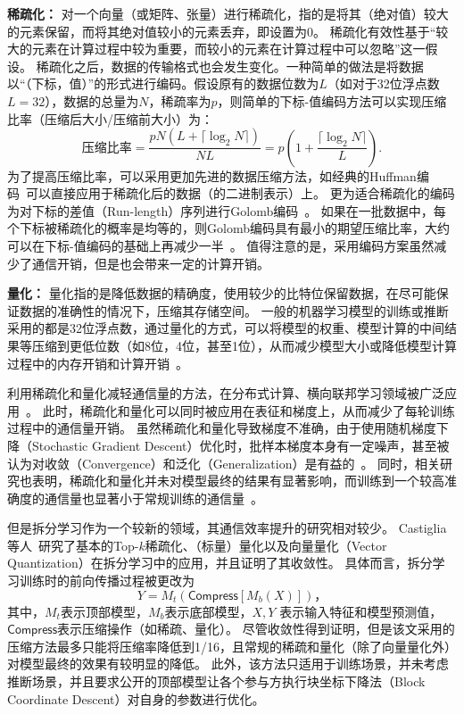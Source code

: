 \textbf{稀疏化：}
对一个向量（或矩阵、张量）进行稀疏化，指的是将其（绝对值）较大的元素保留，而将其绝对值较小的元素丢弃，即设置为0。
%
稀疏化有效性基于“较大的元素在计算过程中较为重要，而较小的元素在计算过程中可以忽略”这一假设。
%
稀疏化之后，数据的传输格式也会发生变化。一种简单的做法是将数据以“（下标，值）”的形式进行编码。假设原有的数据位数为$L$（如对于32位浮点数$L=32$），数据的总量为$N$，稀疏率为$p$，则简单的下标-值编码方法可以实现压缩比率（压缩后大小/压缩前大小）为：
\begin{equation}
    \text{压缩比率}=\dfrac{pN(L + \lceil \log_2N \rceil)}{NL} = p(1 + \dfrac{\lceil \log_2N \rceil}{L}).
\end{equation}
为了提高压缩比率，可以采用更加先进的数据压缩方法，如经典的Huffman编码~\cite{huffman1952}可以直接应用于稀疏化后的数据（的二进制表示）上。
%
更为适合稀疏化的编码为对下标的差值（Run-length）序列进行Golomb编码~\cite{gallager1975golomb}。
%
如果在一批数据中，每个下标被稀疏化的概率是均等的，则Golomb编码具有最小的期望压缩比率，大约可以在下标-值编码的基础上再减少一半~\cite{sattler2019sparse_binary}。
%
值得注意的是，采用编码方案虽然减少了通信开销，但是也会带来一定的计算开销。


\textbf{量化：}
量化指的是降低数据的精确度，使用较少的比特位保留数据，在尽可能保证数据的准确性的情况下，压缩其存储空间。
%
一般的机器学习模型的训练或推断采用的都是32位浮点数，通过量化的方式，可以将模型的权重、模型计算的中间结果等压缩到更低位数（如8位，4位，甚至1位），从而减少模型大小或降低模型计算过程中的内存开销和计算开销~\cite{zhou2016dorefa,banner2018_8bit,yang2019quantization}。




利用稀疏化和量化减轻通信量的方法，在分布式计算、横向联邦学习领域被广泛应用~\cite{wen2017terngrad,sattler2019sparse_binary}。
%
此时，稀疏化和量化可以同时被应用在表征和梯度上，从而减少了每轮训练过程中的通信量开销。
%
虽然稀疏化和量化导致梯度不准确，由于使用随机梯度下降（Stochastic Gradient Descent）优化时，批样本梯度本身有一定噪声，甚至被认为对收敛（Convergence）和泛化（Generalization）是有益的~\cite{hardt2016sgd,goyal2017sgd_imagenet,chaudhari2018sgd}。
%
同时，相关研究也表明，稀疏化和量化并未对模型最终的结果有显著影响，而训练到一个较高准确度的通信量也显著小于常规训练的通信量~\cite{aji2017sparse,sattler2019sparse_binary,wen2017terngrad}。

%
但是拆分学习作为一个较新的领域，其通信效率提升的研究相对较少。
%
Castiglia等人~\cite{castiglia2022compressed_vfl}研究了基本的Top-$k$稀疏化、（标量）量化以及向量量化（Vector Quantization）在拆分学习中的应用，并且证明了其收敛性。
%
具体而言，拆分学习训练时的前向传播过程被更改为
\begin{equation}
\label{eq:split-compress}
    Y = M_t(\mathsf{Compress}[M_b(X)])，
\end{equation}
%
其中，$M_t$表示顶部模型，$M_b$表示底部模型，$X, Y$ 表示输入特征和模型预测值，$\mathsf{Compress}$表示压缩操作（如稀疏、量化）。
%
尽管收敛性得到证明，但是该文采用的压缩方法最多只能将压缩率降低到1/16，且常规的稀疏和量化（除了向量量化外）对模型最终的效果有较明显的降低。
%
此外，该方法只适用于训练场景，并未考虑推断场景，并且要求公开的顶部模型让各个参与方执行块坐标下降法（Block Coordinate Descent）对自身的参数进行优化。

